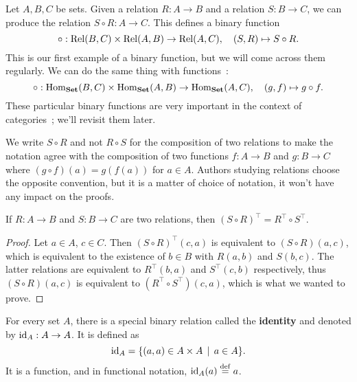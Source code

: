 \begin{example}
	Let $A,B,C$ be sets. Given a relation $R : A \to B$ and a relation $S : B \to C$, we can produce the relation $S \circ R : A \to C$. This defines a binary function 
	\[
		\circ : \mathrm{Rel}(B,C) \times \mathrm{Rel}(A,B) \to \mathrm{Rel}(A,C), \quad (S, R) \mapsto S \circ R. 
	\]
	This is our first example of a binary function, but we will come across them regularly. We can do the same thing with functions~:
	\[
		\circ : \mathrm{Hom}_{\mathbf{Set}}(B,C) \times \mathrm{Hom}_{\mathbf{Set}}(A,B) \to \mathrm{Hom}_{\mathbf{Set}}(A,C), \quad (g, f) \mapsto g \circ f. 
	\]
	These particular binary functions are very important in the context of categories~; we'll revisit them later.
\end{example}

\begin{remark}
	We write $S \circ R$ and not $R \circ S$ for the composition of two relations to make the notation agree with the composition of two functions $f: A \to B$ and $g : B \to C$ where $(g \circ f)(a) = g(f(a))$ for $a \in A$. Authors studying relations choose the opposite convention, but it is a matter of choice of notation, it won't have any impact on the proofs.
\end{remark}


\begin{lemma} \label{transpose-of-relation-composition}
	If $R : A \to B$ and $S : B \to C$ are two relations, then $(S \circ R)^{\top} = R^{\top} \circ S^{\top}$.
\end{lemma}

\begin{proof}
	Let $a \in A$, $c \in C$. Then $(S \circ R)^{\top}(c,a)$ is equivalent to $(S \circ R)(a,c)$, which is equivalent to the existence of $b \in B$ with $R(a,b)$ and $S(b,c)$. The latter relations are equivalent to $R^{\top}(b,a)$ and $S^{\top}(c,b)$ respectively, thus $(S \circ R)(a,c)$ is equivalent to $(R^{\top} \circ S^{\top})(c,a)$, which is what we wanted to prove.  
\end{proof}

\begin{example}
	For every set $A$, there is a special binary relation called the \textbf{identity} and denoted by $\operatorname{\mathrm{id}}_{A} : A \to A$. It is defined as 
	\[
		\operatorname{\mathrm{id}}_{A} = \{ (a,a) \in A \times A \, \mid \, a \in A \}.
	\]
	It is a function, and in functional notation, $\operatorname{\mathrm{id}}_{A}(a) \overset{\mathrm{def}}{=} a$. 
\end{example}

